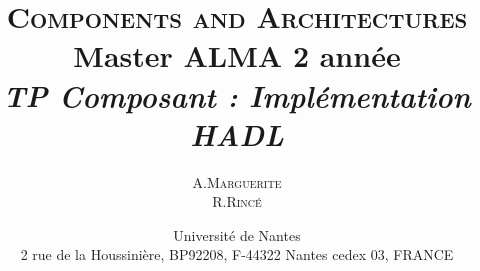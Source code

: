 \documentclass{report}
\title{ {\huge \textsc{Components and Architectures}} \\Master ALMA 2\up{eme} année \\\vspace{3cm} \emph{TP Composant : Implémentation HADL}\vspace{3cm}}
\author{A.\textsc{Marguerite}\\ R.\textsc{Rincé}\vspace{3cm}}
\date{Université de Nantes \\ 2 rue de la Houssinière, BP92208, F-44322 Nantes cedex 03, FRANCE}
\begin{document}
\maketitle
\renewcommand{\labelitemi}{$\bullet$} 

\clearpage

\tableofcontents
\clearpage

%





\listoffigures
%
%
\end{document}

